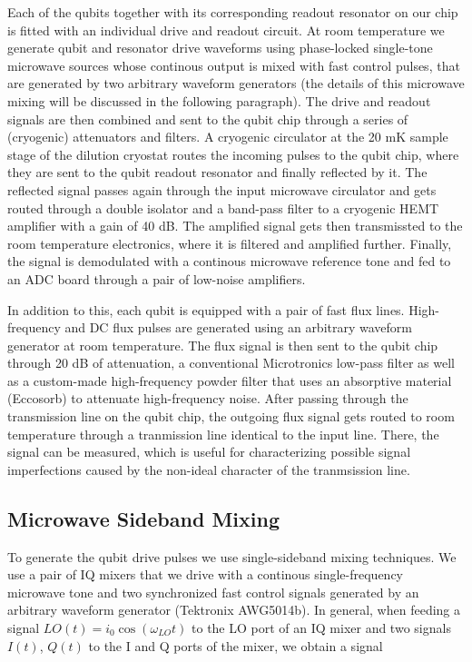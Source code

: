 Each of the qubits together with its corresponding readout resonator on our chip is fitted with an individual drive and readout circuit. At room temperature we generate qubit and resonator drive waveforms using phase-locked single-tone microwave sources whose continous output is mixed with fast control pulses, that are generated by two arbitrary waveform generators (the details of this microwave mixing will be discussed in the following paragraph). The drive and readout signals are then combined and sent to the qubit chip through a series of (cryogenic) attenuators and filters. A cryogenic circulator at the 20 mK sample stage of the dilution cryostat routes the incoming pulses to the qubit chip, where they are sent to the qubit readout resonator and finally reflected by it. The reflected signal passes again through the input microwave circulator and gets routed through a double isolator and a band-pass filter to a cryogenic HEMT amplifier with a gain of 40 dB. The amplified signal gets then transmissted to the room temperature electronics, where it is filtered and amplified further. Finally, the signal is demodulated with a continous microwave reference tone and fed to an ADC board through a pair of low-noise amplifiers.

\smallskip

In addition to this, each qubit is equipped with a pair of fast flux lines. High-frequency and DC flux pulses are generated using an arbitrary waveform generator at room temperature. The flux signal is then sent to the qubit chip through 20 dB of attenuation, a conventional Microtronics low-pass filter as well as a custom-made high-frequency powder filter that uses an absorptive material (Eccosorb) to attenuate high-frequency noise. After passing through the transmission line on the qubit chip, the outgoing flux signal gets routed to room temperature through a tranmission line identical to the input line. There, the signal can be measured, which is useful for characterizing possible signal imperfections caused by the non-ideal character of the tranmsission line.

\subsection{Microwave Sideband Mixing}

To generate the qubit drive pulses we use single-sideband mixing techniques. We use a pair of IQ mixers that we drive with a continous single-frequency microwave tone and two synchronized fast control signals generated by an arbitrary waveform generator (Tektronix AWG5014b). In general, when feeding a signal $LO(t) = i_0 \cos{(\omega_{LO} t )}$ to the LO port of an IQ mixer and two signals $I(t)$, $Q(t)$ to the I and Q ports of the mixer, we obtain a signal

